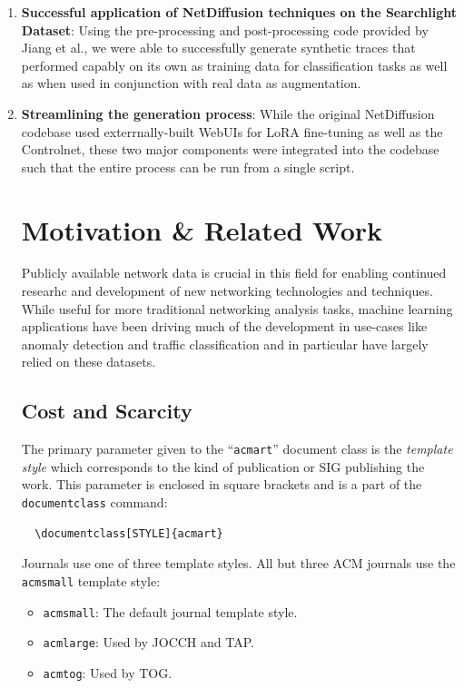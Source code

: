 \documentclass[acmsmall, nonacm]{acmart}
\begin{document}
\begin{enumerate}
  \item \textbf{Successful application of NetDiffusion techniques on the Searchlight Dataset}:
  Using the pre-processing and post-processing code provided by Jiang et al., we were able to
  successfully generate synthetic traces that performed capably on its own as training
  data for classification tasks as well as when used in conjunction with real data 
  as augmentation.
  \item \textbf{Streamlining the generation process}: While the original NetDiffusion codebase
  used exterrnally-built WebUIs for LoRA fine-tuning as well as the Controlnet, 
  these two major components were integrated into the codebase such that the 
  entire process can be run from a single script.

\section{Motivation \& Related Work}
Publicly available network data is crucial in this field for enabling continued
researhc and development of new networking technologies and techniques. While useful for
more traditional networking analysis tasks, machine learning applications have been driving
much of the development in use-cases like anomaly detection and traffic classification and 
in particular have largely relied on these datasets.

\subsection{Cost and Scarcity}

The primary parameter given to the ``\verb|acmart|'' document class is
the {\itshape template style} which corresponds to the kind of publication
or SIG publishing the work. This parameter is enclosed in square
brackets and is a part of the {\verb|documentclass|} command:
\begin{verbatim}
  \documentclass[STYLE]{acmart}
\end{verbatim}

Journals use one of three template styles. All but three ACM journals
use the {\verb|acmsmall|} template style:
\begin{itemize}
\item {\texttt{acmsmall}}: The default journal template style.
\item {\texttt{acmlarge}}: Used by JOCCH and TAP.
\item {\texttt{acmtog}}: Used by TOG.
\end{itemize}


\end{enumerate}
\end{document}
